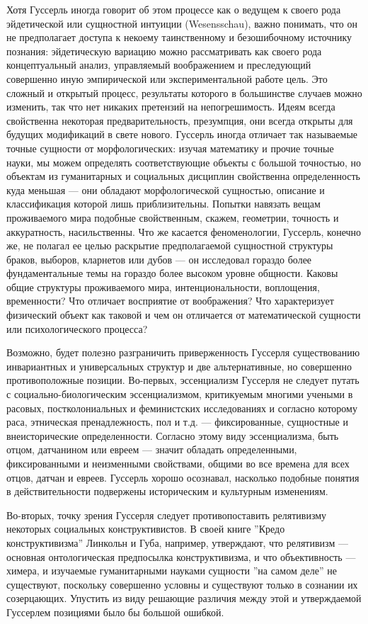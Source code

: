 \documentclass[11pt]{book}
\begin{document}
Хотя Гуссерль иногда говорит об этом процессе как о ведущем к своего рода эйдетической или сущностной интуиции (Wesensschau), важно понимать, что он не предполагает доступа к некоему таинственному и безошибочному источнику познания: эйдетическую вариацию можно рассматривать как своего рода концептуальный анализ, управляемый воображением и преследующий совершенно иную эмпирической или экспериментальной работе цель. Это сложный и открытый процесс, результаты которого в большинстве случаев можно изменить, так что нет никаких претензий на непогрешимость. Идеям всегда свойственна некоторая предварительность, презумпция, они всегда открыты для будущих модификаций в свете нового. Гуссерль иногда отличает так называемые точные сущности от морфологических: изучая математику и прочие точные науки, мы можем определять соответствующие объекты с большой точностью, но объектам из гуманитарных и социальных дисциплин свойственна определенность куда меньшая --- они обладают морфологической сущностью, описание и классификация которой лишь приблизительны. Попытки навязать вещам проживаемого мира подобные свойственным, скажем, геометрии, точность и аккуратность, насильственны. Что же касается феноменологии, Гуссерль, конечно же, не полагал ее целью раскрытие предполагаемой сущностной структуры браков, выборов, кларнетов или дубов --- он исследовал гораздо более фундаментальные темы на гораздо более высоком уровне общности. Каковы общие структуры проживаемого мира, интенциональности, воплощения, временности? Что отличает восприятие от воображения? Что характеризует физический объект как таковой и чем он отличается от математической сущности или психологического процесса?

Возможно, будет полезно разграничить приверженность Гуссерля существованию инвариантных и универсальных структур и две альтернативные, но совершенно противоположные позиции. Во-первых, эссенциализм Гуссерля не следует путать с социально-биологическим эссенциализмом, критикуемым многими учеными в расовых, постколониальных и феминистских исследованиях и согласно которому раса, этническая пренадлежность, пол и т.д. --- фиксированные, сущностные и внеисторические определенности. Согласно этому виду эссенциализма, быть отцом, датчанином или евреем --- значит обладать определенными, фиксированными и неизменными свойствами, общими во все времена для всех отцов, датчан и евреев. Гуссерль хорошо осознавал, насколько подобные понятия в действительности подвержены историческим и культурным изменениям.

Во-вторых, точку зрения Гуссерля следует противопоставить релятивизму некоторых социальных конструктивистов. В своей книге ''Кредо конструктивизма'' Линкольн и Губа, например, утверждают, что релятивизм --- основная онтологическая предпосылка конструктивизма, и что объективность --- химера, и изучаемые гуманитарными науками сущности ''на самом деле'' не существуют, поскольку совершенно условны и существуют только в сознании их созерцающих. Упустить из виду решающие различия между этой и утверждаемой Гуссерлем позициями было бы большой ошибкой.
\end{document}
